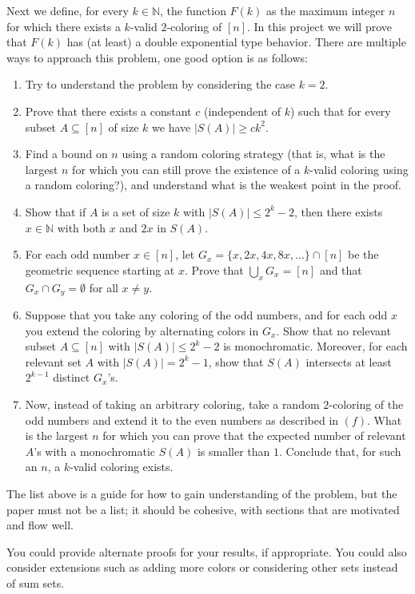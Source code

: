 \documentclass[11pt,letterpaper]{article}
\begin{document}
Next we define, for every $k\in \mathbb{N}$, the function $F(k)$ as the maximum integer $n$ for which there exists a $k$-valid $2$-coloring of $[n]$. In this project we will prove that $F(k)$ has (at least) a double exponential type behavior. There are multiple ways to approach this problem, one good option is as follows:

\begin{enumerate}
\item
Try to understand the problem by considering the case $k=2$.
\item
Prove that there exists a constant $c$ (independent of $k$) such that for every subset $A\subseteq [n]$ of size $k$ we have $|S(A)|\geq ck^2$.
\item Find a bound on $n$ using a random coloring strategy (that is, what is the largest $n$ for which you can still prove the existence of a $k$-valid coloring using a random coloring?), and understand what is the weakest point in the proof.
\item  Show that if $A$ is a set of size $k$ with $|S(A)|\leq 2^k-2$, then there exists $x\in \mathbb{N}$ with both $x$ and $2x$ in $S(A)$.
\item For each odd number $x\in [n]$, let $G_x=\{x,2x,4x,8x,\ldots \}\cap [n]$ be the geometric sequence starting at $x$. Prove that $\bigcup_{x} G_x =[n]$ and that $G_x\cap G_y=\emptyset$ for all $x\neq y$.
\item Suppose that you take any coloring of the odd numbers, and for each odd $x$ you extend the coloring by alternating colors in $G_x$. Show that no relevant subset $A\subseteq [n]$ with $|S(A)|\leq 2^k-2$ is monochromatic.  Moreover, for each relevant set $A$ with $|S(A)|=2^{k}-1$, show that $S(A)$ intersects at least $2^{k-1}$ distinct $G_x$'s.

\item Now, instead of taking an arbitrary coloring, take a random $2$-coloring of the odd numbers and extend it to the even numbers as described in $(f)$.  What is the largest $n$ for which you can prove that the expected number of relevant $A$'s with a monochromatic $S(A)$ is smaller than $1$. Conclude that, for such an $n$, a $k$-valid coloring exists.
\end{enumerate}

The list above is a guide for how to gain understanding of the problem, but the paper must not be a list; it should be cohesive, with sections that are motivated and flow well.

You could provide alternate proofs for your results, if appropriate. You could also consider extensions such as adding more colors or considering other sets instead of sum sets.
\end{document}
